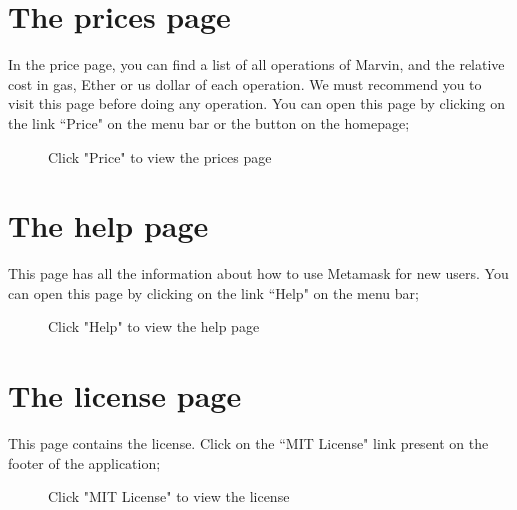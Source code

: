 \documentclass[ManualeUtente]{subfiles}
\begin{document}
\section{The prices page}
 In the price page, you can find a list of all operations of Marvin, and the relative cost in gas, Ether or us dollar of each operation. We must recommend you to visit this page before doing any operation. You can open this page by clicking on the link \textquotedblleft Price" on the menu bar or the button on the homepage;
	\begin{figure}[H]
		\centering
		\caption{Click "Price" to view the prices page}
		\label{fig:Click "Price" to view the prices page}
	\end{figure}


\section{The help page}
 This page has all the information about how to use Metamask for new users. You can open this page by clicking on the link \textquotedblleft Help" on the menu bar;
	\begin{figure}[H]
		\centering
		\caption{Click "Help" to view the help page}
		\label{fig:Click "Help" to view the help page}
	\end{figure}

\newpage
\section{The license page}
This page contains the license. Click on the \textquotedblleft MIT License" link present on the footer of the application;
	\begin{figure}[H]
		\centering
		\caption{Click "MIT License" to view the license}
		\label{fig:Click "MIT License" to view the license}
	\end{figure}
\end{document}
